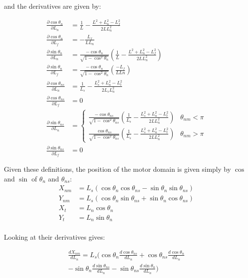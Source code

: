 \documentclass[11pt,twocolumn]{article}
\begin{document}
and the derivatives are given by:

\begin{align}
  \frac{\partial \cos\theta_n}{\partial L_n} &= \frac{1}{L} - \frac{L^2 + L_n^2 - L_f^2}{2L L_n^2}\\
  \frac{\partial \cos\theta_n}{\partial L_f} &= -\frac{L_f}{LL_n}\\
  \frac{\partial \sin\theta_n}{\partial L_n} &= \frac{-\cos\theta_n}{\sqrt{1-\cos^2\theta_n}}
  \left(\frac{1}{L} - \frac{L^2 + L_n^2 - L_f^2}{2L L_n^2}\right)\\
  \frac{\partial \sin\theta_n}{\partial L_f} &= \frac{-\cos\theta_n}{\sqrt{1-\cos^2\theta_n}}
  \left(\frac{-L_f}{LLn}\right)\\
  \frac{\partial \cos\theta_{ns}}{\partial L_n} &= \frac{1}{L_s}
  - \frac{L_s^2 + L_n^2 - L_t^2}{2L_sL_n^2}\\
  \frac{\partial \cos\theta_{ns}}{\partial L_f} &= 0\\
  \frac{\partial \sin\theta_{ns}}{\partial L_n} &=
  \begin{cases}
    \frac{-\cos\theta_{ns}}{\sqrt{1-\cos^2\theta_{ns}}}
    \left(\frac{1}{L_s} - \frac{L_s^2+L_n^2-L_t^2}{2LL_n^2}\right) & \theta_{nm} < \pi \\
    \frac{\cos\theta_{ns}}{\sqrt{1-\cos^2\theta_{ns}}}
    \left(\frac{1}{L_s} - \frac{L_s^2+L_n^2-L_t^2}{2LL_n^2}\right) & \theta_{nm} > \pi
  \end{cases}\\
  \frac{\partial \sin\theta_{ns}}{\partial L_f} &= 0
\end{align}

Given these definitions, the position of the motor domain is given
simply by $\cos$ and $\sin$ of $\theta_n$ and $\theta_{ns}$:
\begin{align}
  X_{nm} &= L_s\left(
  \cos\theta_n\cos\theta_{ns} - \sin\theta_n\sin\theta_{ns}
  \right)
  \\
  Y_{nm} &= L_s\left(
  \cos\theta_n\sin\theta_{ns} + \sin\theta_n\cos\theta_{ns}
  \right)
  \\
  X_{t} &= L_n\cos\theta_n\\
  Y_{t} &= L_n\sin\theta_n\\
\end{align}

Looking at their derivatives gives:

\begin{multline}
  \frac{dX_{nm}}{dL_n} = L_s\Big(
  \cos\theta_n\frac{d\cos\theta_{ns}}{dL_n}
  + \cos\theta_{ns}\frac{d\cos\theta_{n}}{dL_n} \\
  - \sin\theta_n\frac{d\sin\theta_{ns}}{dL_n}
  - \sin\theta_{ns}\frac{d\sin\theta_{n}}{dL_n}
  \Big)\\
\end{multline}
\end{document}
